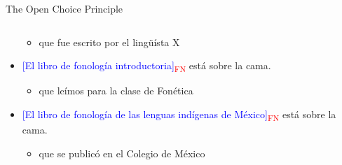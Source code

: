 \documentclass{beamer}
\begin{document}
\begin{frame}{The Open Choice Principle}
\begin{columns}
\begin{column}{6cm}
\begin{itemize}
\begin{itemize}
            \pause
            \item que fue escrito por el lingüísta X
        \end{itemize}
        \pause
        \item \textcolor{blue}{{[El libro de fonología introductoria]}}\textcolor{red}{\textsubscript{FN}} está sobre la cama.
        \begin{itemize}
            \item que leímos para la clase de Fonética
        \end{itemize}
        \item \textcolor{blue}{{[El libro de fonología de las lenguas indígenas de México]}}\textcolor{red}{\textsubscript{FN}} está sobre la cama.
        \begin{itemize}
            \item que se publicó en el Colegio de México
        \end{itemize}
        \end{itemize}
        \end{column}
    \end{columns}
\end{frame}
\end{document}
